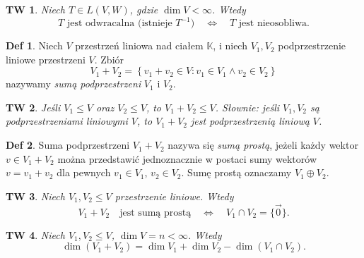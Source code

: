 \documentclass[a4paper, 12pt]{mwart}
\theoremstyle{definition}
\newtheorem{definicja}{Def}[section]
\theoremstyle{plain}
\newtheorem{twierdzenie}{TW}[section]
\theoremstyle{remark}
\begin{document}
\begin{twierdzenie}
	Niech $T \in L(V, W)$, gdzie $\dim V < \infty$. Wtedy
	\begin{equation}
		T \text{ jest odwracalna (istnieje $T^{-1}$)}  \quad \iff \quad T \text{ jest nieosobliwa}.
	\end{equation}
\end{twierdzenie}
\begin{definicja}
	Niech $V$ \ppauza przestrzeń liniowa nad ciałem $\mathbb{K}$, i niech $V_1, V_2$ \ppauza podprzestrzenie liniowe przestrzeni $V$. Zbiór
	\begin{equation}
		V_1 + V_2 = \left\{v_1 + v_2 \in V: v_1 \in V_1 \land v_2 \in V_2\right\}
	\end{equation}
	nazywamy \emph{sumą podprzestrzeni} $V_1$ i $V_2$.
\end{definicja}
\begin{twierdzenie}
	Jeśli $V_1 \leq V$ oraz $V_2 \leq V$, to $V_1 + V_2 \leq V$.
	Słownie: jeśli $V_1, V_2$ są podprzestrzeniami liniowymi $V$, to $V_1 + V_2$ jest podprzestrzenią liniową $V$.
\end{twierdzenie}
\begin{definicja}
	Suma podprzestrzeni $V_1 + V_2$ nazywa się \emph{sumą prostą}, jeżeli każdy wektor $v \in V_1 + V_2$  można przedstawić jednoznacznie w postaci sumy wektorów $v = v_1 + v_2$ dla pewnych $v_1 \in V_1$, $v_2 \in V_2$. Sumę prostą oznaczamy $V_1 \oplus V_2$.
\end{definicja}
\begin{twierdzenie}
	Niech $V_1, V_2 \leq V$ \ppauza przestrzenie liniowe. Wtedy
	\begin{equation}
		V_1 + V_2 \quad \text{jest sumą prostą} \quad \iff \quad V_1 \cap V_2 = \{\vec{0}\}.
	\end{equation}
\end{twierdzenie}
\begin{twierdzenie}
	Niech $V_1, V_2 \leq V$, $\dim V = n < \infty$. Wtedy
	\begin{equation}
		\dim (V_1 + V_2) = \dim V_1 + \dim V_2 - \dim (V_1 \cap V_2).
	\end{equation}
\end{twierdzenie}
\end{document}
